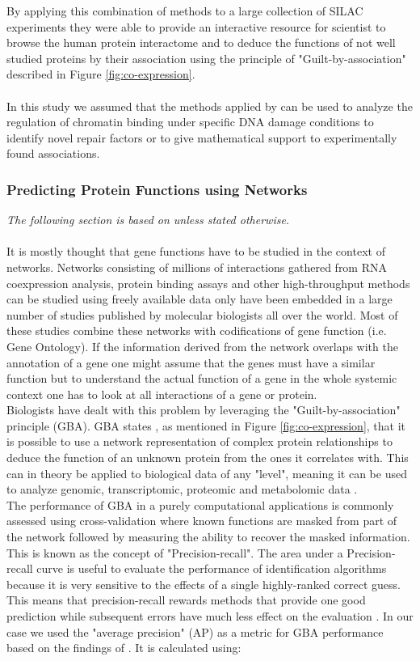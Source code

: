 By applying this combination of methods to a large collection of SILAC experiments they were able to provide an interactive resource for scientist to browse the human protein interactome and to deduce the functions of not well studied proteins by their association using the principle of "Guilt-by-association" described in Figure \ref{fig:co-expression}.\\\\
In this study we assumed that the methods applied by \cite{Kustatscher.2019} can be used to analyze the regulation of chromatin binding under specific DNA damage conditions to identify novel repair factors or to give mathematical support to experimentally found associations. 

\subsubsection{Predicting Protein Functions using Networks}
\textit{The following section is based on \cite{Gillis.2012} unless stated otherwise.}\\\\
It is mostly thought that gene functions have to be studied in the context of networks. Networks consisting of millions of interactions gathered from RNA coexpression analysis, protein binding assays and other high-throughput methods can be studied using freely available data only have been embedded in a large number of studies published by molecular biologists all over the world. Most of these studies combine these networks with codifications of gene function (i.e. Gene Ontology). If the information derived from the network overlaps with the annotation of a gene one might assume that the genes must have a similar function but to understand the actual function of a gene in the whole systemic context one has to look at all interactions of a gene or protein.\\
Biologists have dealt with this problem by leveraging the "Guilt-by-association" principle (GBA). GBA states , as mentioned in Figure \ref{fig:co-expression}, that it is possible to use a network representation of complex protein relationships to deduce the function of an unknown protein from the ones it correlates with. This can in theory be applied to biological data of any "level", meaning it can be used to analyze genomic, transcriptomic, proteomic and metabolomic data \citep{Oliver.2000}.\\ The performance of GBA in a purely computational applications is commonly assessed using cross-validation where known functions are masked from part of the network followed by measuring the ability to recover the masked information. This is known as the concept of "Precision-recall". The area under a Precision-recall curve is useful to evaluate the performance of identification algorithms because it is very sensitive to the effects of a single highly-ranked correct guess. This means that precision-recall rewards methods that provide one good prediction while subsequent errors have much less effect on the evaluation \citep[S1]{Gillis.2012}. In our case we used the "average precision" (AP) as a metric for GBA performance based on the findings of \cite{Gillis.2012}. It is calculated using:\\
